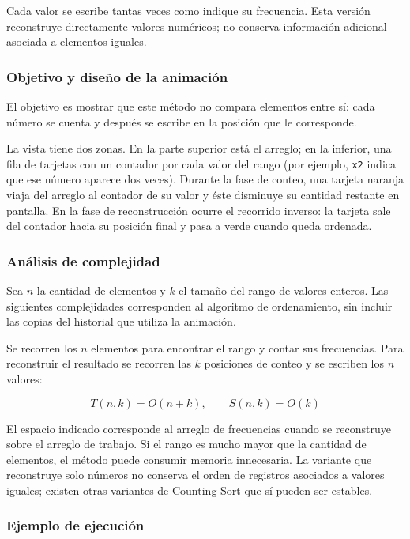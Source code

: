 \documentclass[11pt,letterpaper]{article}
\begin{document}
Cada valor se escribe tantas veces como indique su frecuencia. Esta versión reconstruye directamente valores numéricos; no conserva información adicional asociada a elementos iguales.

\subsubsection{Objetivo y diseño de la animación}

El objetivo es mostrar que este método no compara elementos entre sí: cada número se cuenta y después se escribe en la posición que le corresponde.

La vista tiene dos zonas. En la parte superior está el arreglo; en la inferior, una fila de tarjetas con un contador por cada valor del rango (por ejemplo, \texttt{x2} indica que ese número aparece dos veces). Durante la fase de conteo, una tarjeta naranja viaja del arreglo al contador de su valor y éste disminuye su cantidad restante en pantalla. En la fase de reconstrucción ocurre el recorrido inverso: la tarjeta sale del contador hacia su posición final y pasa a verde cuando queda ordenada.

\subsubsection{Análisis de complejidad}

Sea \(n\) la cantidad de elementos y \(k\) el tamaño del rango de valores enteros. Las siguientes complejidades corresponden al algoritmo de ordenamiento, sin incluir las copias del historial que utiliza la animación.

Se recorren los \(n\) elementos para encontrar el rango y contar sus frecuencias. Para reconstruir el resultado se recorren las \(k\) posiciones de conteo y se escriben los \(n\) valores:

\[
T(n,k)=O(n+k), \qquad S(n,k)=O(k)
\]

El espacio indicado corresponde al arreglo de frecuencias cuando se reconstruye sobre el arreglo de trabajo. Si el rango es mucho mayor que la cantidad de elementos, el método puede consumir memoria innecesaria. La variante que reconstruye solo números no conserva el orden de registros asociados a valores iguales; existen otras variantes de Counting Sort que sí pueden ser estables.

\subsubsection{Ejemplo de ejecución}
\end{document}
